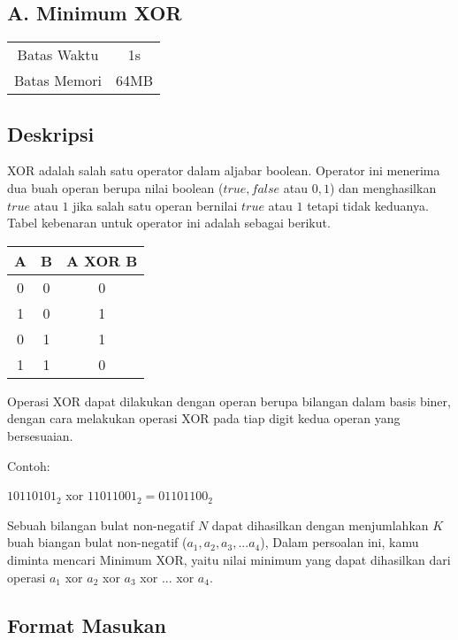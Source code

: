 \documentclass{article}
\begin{document}
\begin{center}
    \section*{A. Minimum XOR} %

    \begin{tabular}{ | c c | }
        \hline
        Batas Waktu  & 1s \\    %
        Batas Memori & 64MB \\  %
        \hline
    \end{tabular}
\end{center}

\subsection*{Deskripsi}

XOR adalah salah satu operator dalam aljabar boolean. Operator ini menerima dua buah operan berupa nilai boolean ($true, false$ atau $0, 1$) dan menghasilkan $true$ atau $1$ jika salah satu operan bernilai $true$ atau $1$ tetapi tidak keduanya. Tabel kebenaran untuk operator ini adalah sebagai berikut.

\begin{center}
\begin{tabular}{c|c|c}
A & B & A XOR B \\ \hline
0 & 0 & 0       \\
1 & 0 & 1       \\
0 & 1 & 1       \\
1 & 1 & 0
\end{tabular}
\end{center}
Operasi XOR dapat dilakukan dengan operan berupa bilangan dalam basis biner, dengan cara melakukan operasi XOR pada tiap digit kedua operan yang bersesuaian.

Contoh:
\begin{center}
$10110101_2$ xor $11011001_2 = 01101100_2$
\end{center}

Sebuah bilangan bulat non-negatif $N$ dapat dihasilkan dengan menjumlahkan $K$ buah biangan bulat non-negatif ($a_1, a_2, a_3, ... a_4$), Dalam persoalan ini, kamu diminta mencari Minimum XOR, yaitu nilai minimum yang dapat dihasilkan dari operasi  $a_1$ xor $a_2$ xor $a_3$ xor $...$ xor $a_4$.

\subsection*{Format Masukan}
\end{document}
